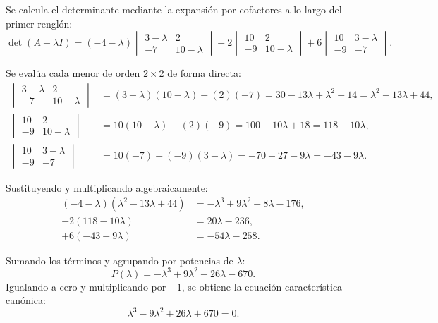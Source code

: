 \documentclass[spanish,letterpaper,oneside]{article}
\begin{document}
Se calcula el determinante mediante la expansión por cofactores a lo largo del primer renglón:
\begin{equation}
\det(A - \lambda I) = (-4 - \lambda) \begin{vmatrix} 3 - \lambda & 2 \\ -7 & 10 - \lambda \end{vmatrix} - 2 \begin{vmatrix} 10 & 2 \\ -9 & 10 - \lambda \end{vmatrix} + 6 \begin{vmatrix} 10 & 3 - \lambda \\ -9 & -7 \end{vmatrix}.
\end{equation}

Se evalúa cada menor de orden $2 \times 2$ de forma directa:
\begin{align}
\begin{vmatrix} 3 - \lambda & 2 \\ -7 & 10 - \lambda \end{vmatrix} &= (3 - \lambda)(10 - \lambda) - (2)(-7) = 30 - 13\lambda + \lambda^2 + 14 = \lambda^2 - 13\lambda + 44, \\
\begin{vmatrix} 10 & 2 \\ -9 & 10 - \lambda \end{vmatrix} &= 10(10 - \lambda) - (2)(-9) = 100 - 10\lambda + 18 = 118 - 10\lambda, \\
\begin{vmatrix} 10 & 3 - \lambda \\ -9 & -7 \end{vmatrix} &= 10(-7) - (-9)(3 - \lambda) = -70 + 27 - 9\lambda = -43 - 9\lambda.
\end{align}

Sustituyendo y multiplicando algebraicamente:
\begin{align*}
(-4 - \lambda)(\lambda^2 - 13\lambda + 44) &= -\lambda^3 + 9\lambda^2 + 8\lambda - 176, \\
-2(118 - 10\lambda) &= 20\lambda - 236, \\
+6(-43 - 9\lambda) &= -54\lambda - 258.
\end{align*}

Sumando los términos y agrupando por potencias de $\lambda$:
\begin{equation}
P(\lambda) = -\lambda^3 + 9\lambda^2 - 26\lambda - 670.
\end{equation}
Igualando a cero y multiplicando por $-1$, se obtiene la ecuación característica canónica:
\begin{equation}\label{eq:polinomio_final}
\lambda^3 - 9\lambda^2 + 26\lambda + 670 = 0.
\end{equation}
\end{document}
